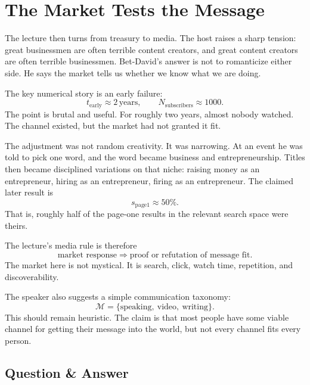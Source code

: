 \section{The Market Tests the Message}

The lecture then turns from treasury to media. The host raises a sharp tension: great businessmen are often terrible content creators, and great content creators are often terrible businessmen. Bet-David's answer is not to romanticize either side. He says the market tells us whether we know what we are doing.

The key numerical story is an early failure:
\begin{equation}
t_{\text{early}} \approx 2\,\text{years},\qquad
N_{\text{subscribers}} \approx 1000.
\end{equation}
The point is brutal and useful. For roughly two years, almost nobody watched. The channel existed, but the market had not granted it fit.

The adjustment was not random creativity. It was narrowing. At an event he was told to pick one word, and the word became business and entrepreneurship. Titles then became disciplined variations on that niche: raising money as an entrepreneur, hiring as an entrepreneur, firing as an entrepreneur. The claimed later result is
\begin{equation}
s_{\text{page1}} \approx 50\%.
\end{equation}
That is, roughly half of the page-one results in the relevant search space were theirs.

The lecture's media rule is therefore
\begin{equation}
\text{market response}\Rightarrow \text{proof or refutation of message fit}.
\end{equation}
The market here is not mystical. It is search, click, watch time, repetition, and discoverability.

The speaker also suggests a simple communication taxonomy:
\begin{equation}
\mathcal{M}=\{\text{speaking},\ \text{video},\ \text{writing}\}.
\end{equation}
This should remain heuristic. The claim is that most people have some viable channel for getting their message into the world, but not every channel fits every person.

\subsection{Question \& Answer}

